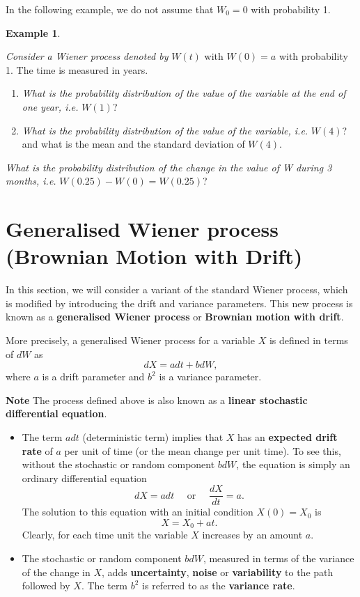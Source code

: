 \documentclass[
]{book}
\theoremstyle{definition}
\theoremstyle{definition}
\newtheorem{example}{Example}[chapter]
\theoremstyle{definition}
\theoremstyle{definition}
\theoremstyle{remark}
\begin{document}
In the following example, we do not assume that \(W_0 = 0\) with
probability 1.

\begin{example}
\protect\hypertarget{exm:unlabeled-div-75}{}\label{exm:unlabeled-div-75}

\emph{Consider a Wiener process denoted by} \(W(t)\) with \(W(0) = a\) with
probability 1. The time is measured in years.

\begin{enumerate}
\def\labelenumi{\arabic{enumi}.}
\item
  \emph{What is the probability distribution of the value of the variable
  at the end of one year, i.e.} \(W(1)\)?
\item
  \emph{What is the probability distribution of the value of the variable,
  i.e.} \(W(4)\)? and what is the mean and the standard deviation of
  \(W(4)\).
\end{enumerate}

\emph{What is the probability distribution of the change in the value of W
during 3 months, i.e.} \(W(0.25) - W(0) = W(0.25)\)?

\end{example}

\hypertarget{generalised-wiener-process-brownian-motion-with-drift}{%
\section{Generalised Wiener process (Brownian Motion with Drift)}\label{generalised-wiener-process-brownian-motion-with-drift}}

In this section, we will consider a variant of the standard Wiener
process, which is modified by introducing the drift and variance
parameters. This new process is known as a \textbf{generalised Wiener
process} or \textbf{Brownian motion with drift}.

More precisely, a generalised Wiener process for a variable \(X\) is
defined in terms of \(dW\) as \[dX = a dt + b dW,\] where \(a\) is a drift
parameter and \(b^2\) is a variance parameter.

\textbf{Note} The process defined above is also known as a \textbf{linear
stochastic differential equation}.

\begin{itemize}
\item
  The term \(a dt\) (deterministic term) implies that \(X\) has an
  \textbf{expected drift rate} of \(a\) per unit of time (or the mean change
  per unit time). To see this, without the stochastic or random
  component \(b dW\), the equation is simply an ordinary differential
  equation \[dX = a dt \quad \text{ or } \quad \frac{dX}{dt} = a.\]
  The solution to this equation with an initial condition \(X(0) = X_0\)
  is \[X = X_0 + a t.\] Clearly, for each time unit the variable \(X\)
  increases by an amount \(a\).
\item
  The stochastic or random component \(b dW\), measured in terms of the
  variance of the change in \(X\), adds \textbf{uncertainty}, \textbf{noise} or
  \textbf{variability} to the path followed by \(X\). The term \(b^2\) is
  referred to as the \textbf{variance rate}.
\end{itemize}
\end{document}
